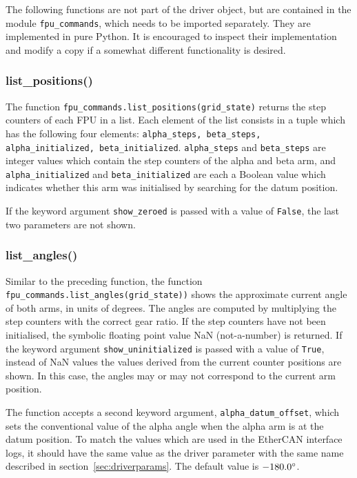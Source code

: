 \documentclass[11pt,a4paper]{report}
\begin{document}
The following functions are not part of the driver object, but are
contained in the module \texttt{fpu\_commands}, which needs to be
imported separately. They are implemented in pure Python. It is
encouraged to inspect their implementation and modify a copy if a
somewhat different functionality is desired.

\subsubsection{list\_positions()}
\label{sec:listpositions}
 
The function \texttt{fpu\_commands.list\_positions(grid\_state)}
returns the step counters of each FPU in a list.  Each element of the
list consists in a tuple which has the following four elements:
\texttt{alpha\_steps, beta\_steps, alpha\_initialized,
  beta\_initialized}. \texttt{alpha\_steps} and \texttt{beta\_steps}
are integer values which contain the step counters of the alpha and
beta arm, and \texttt{alpha\_initialized} and
\texttt{beta\_initialized} are each a Boolean value which indicates
whether this arm was initialised by searching for the datum position.

If the keyword argument \texttt{show\_zeroed} is passed with a value of
\texttt{False}, the last two parameters are not shown.

\subsubsection{list\_angles()}
\label{sec:listangles}

Similar to the preceding function, the function
\texttt{fpu\_commands.list\_angles(grid\_state))} shows the
approximate current angle of both arms, in units of degrees. The
angles are computed by multiplying the step counters with the correct
gear ratio. If the step counters have not been initialised, the
symbolic floating point value NaN (not-a-number) is returned.  If the
keyword argument \texttt{show\_uninitialized} is passed with a value
of \texttt{True}, instead of NaN values the values derived from the
current counter positions are shown. In this case, the angles may or
may not correspond to the current arm position.

 The function accepts a second keyword
argument, \texttt{alpha\_datum\_offset}, which sets the conventional
value of the alpha angle when the alpha arm is at the datum position.
To match the values which are used in the EtherCAN interface logs, it should have
the same value as the driver parameter with the same name described in
section~\ref{sec:driverparams}. The default value is $-180.0\degree$.
\end{document}
